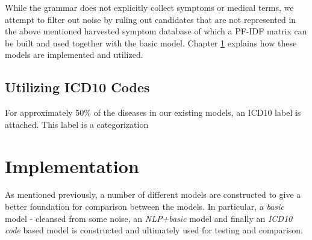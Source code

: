 \documentclass[10pt,letterpaper,final]{article}
\begin{document}
While the grammar does not explicitly collect symptoms or medical terms,
we attempt to filter out noise by ruling out candidates that are not
represented in the above mentioned harvested symptom database of which
a PF-IDF matrix can be built and used together with the basic model.
Chapter \ref{chap:implementation} explains how these models are
implemented and utilized.




\subsection{Utilizing ICD10 Codes}
For approximately 50\% of the diseases in our existing models, an ICD10
label is attached. This label is a categorization




\section{Implementation}
\label{chap:implementation}
As mentioned previously, a number of different models are constructed to
give a better foundation for comparison between the models. In
particular, a \textit{basic} model - cleansed from some noise, an
\textit{NLP+basic} model and finally an \textit{ICD10 code} based model
is constructed and ultimately used for testing and comparison.
\end{document}
